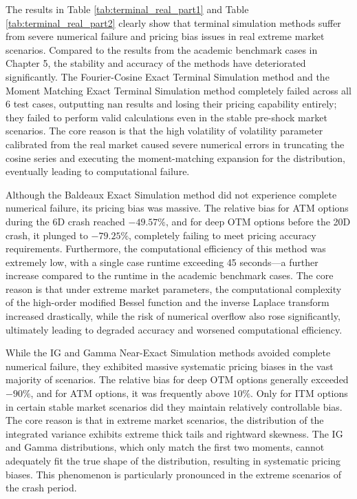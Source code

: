 The results in Table \ref{tab:terminal_real_part1} and Table \ref{tab:terminal_real_part2} clearly show that terminal simulation methods suffer from severe numerical failure and pricing bias issues in real extreme market scenarios. Compared to the results from the academic benchmark cases in Chapter 5, the stability and accuracy of the methods have deteriorated significantly. The Fourier-Cosine Exact Terminal Simulation method and the Moment Matching Exact Terminal Simulation method completely failed across all 6 test cases, outputting $\mathrm{nan}$ results and losing their pricing capability entirely; they failed to perform valid calculations even in the stable pre-shock market scenarios. The core reason is that the high volatility of volatility parameter calibrated from the real market caused severe numerical errors in truncating the cosine series and executing the moment-matching expansion for the distribution, eventually leading to computational failure.

Although the Baldeaux Exact Simulation method did not experience complete numerical failure, its pricing bias was massive. The relative bias for ATM options during the 6D crash reached $-49.57\%$, and for deep OTM options before the 20D crash, it plunged to $-79.25\%$, completely failing to meet pricing accuracy requirements. Furthermore, the computational efficiency of this method was extremely low, with a single case runtime exceeding 45 seconds—a further increase compared to the runtime in the academic benchmark cases. The core reason is that under extreme market parameters, the computational complexity of the high-order modified Bessel function and the inverse Laplace transform increased drastically, while the risk of numerical overflow also rose significantly, ultimately leading to degraded accuracy and worsened computational efficiency.

While the IG and Gamma Near-Exact Simulation methods avoided complete numerical failure, they exhibited massive systematic pricing biases in the vast majority of scenarios. The relative bias for deep OTM options generally exceeded $-90\%$, and for ATM options, it was frequently above $10\%$. Only for ITM options in certain stable market scenarios did they maintain relatively controllable bias. The core reason is that in extreme market scenarios, the distribution of the integrated variance exhibits extreme thick tails and rightward skewness. The IG and Gamma distributions, which only match the first two moments, cannot adequately fit the true shape of the distribution, resulting in systematic pricing biases. This phenomenon is particularly pronounced in the extreme scenarios of the crash period.

